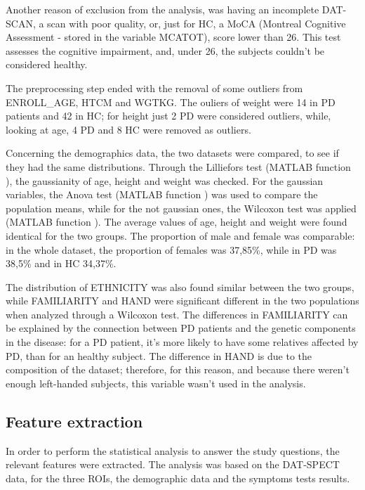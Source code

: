 \documentclass[]{article}
\begin{document}
\begin{multicols}{2}

Another reason of exclusion from the analysis, was having an incomplete DAT-SCAN, a scan with poor quality, or, just for HC, a MoCA (Montreal Cognitive Assessment - stored in the variable MCATOT), score lower than 26. This test assesses the cognitive impairment, and, under 26, the subjects couldn't be considered healthy. 

The preprocessing step ended with the removal of some outliers from ENROLL\_AGE, HTCM and WGTKG. The ouliers of weight were 14 in PD patients and 42 in HC; for height just 2 PD were considered outliers, while, looking at age, 4 PD and 8 HC were removed as outliers.

Concerning the demographics data, the two datasets were compared, to see if they had the same distributions. Through the Lilliefors test (MATLAB function ), the gaussianity of age, height and weight was checked. For the gaussian variables, the Anova test (MATLAB function ) was used to compare the population means, while for the not gaussian ones, the Wilcoxon test was applied (MATLAB function ). The average values of age, height and weight were found identical for the two groups. The proportion of male and female was comparable: in the whole dataset, the proportion of females was 37,85\%, while in PD was 38,5\% and in HC 34,37\%. 

The distribution of ETHNICITY was also found similar between the two groups, while FAMILIARITY and HAND were significant different in the two populations when analyzed through a Wilcoxon test. The differences in FAMILIARITY can be explained by the connection between PD patients and the genetic components in the disease: for a PD patient, it's more likely to have some relatives affected by PD, than for an healthy subject. The difference in HAND is due to the composition of the dataset; therefore, for this reason, and because there weren't enough left-handed subjects, this variable wasn't used in the analysis.

\subsection{Feature extraction}

In order to perform the statistical analysis to answer the study questions, the relevant features were extracted.
The analysis was based on the DAT-SPECT data, for the three ROIs, the demographic data and the symptoms tests results.


\end{multicols}
\end{document}
